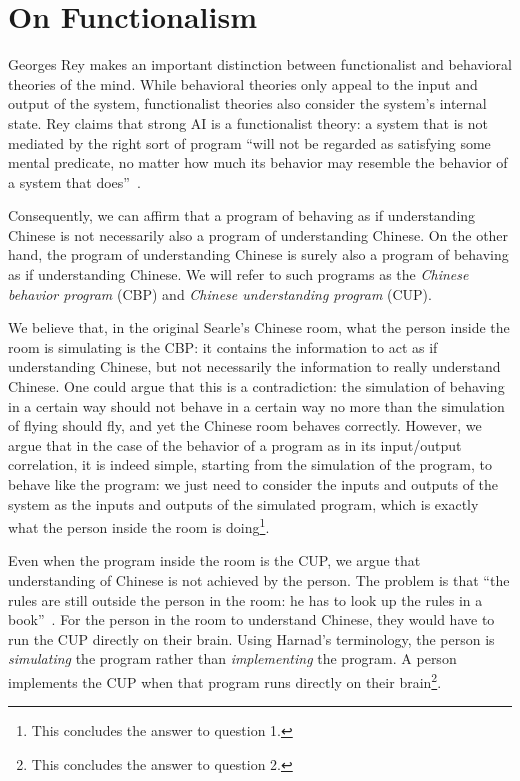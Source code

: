 \section{On Functionalism}
\label{sec:functionalism}

Georges Rey makes an important distinction between functionalist and behavioral theories of the mind. While behavioral theories only appeal to the input and output of the system, functionalist theories also consider the system's internal state. Rey claims that strong AI is a functionalist theory: a system that is not mediated by the right sort of program ``will not be regarded as satisfying some mental predicate, no matter how much its behavior may resemble the behavior of a system that does''~\cite[pp.~2-3]{rey1986s}.

Consequently, we can affirm that a program of behaving as if understanding Chinese is not necessarily also a program of understanding Chinese. On the other hand, the program of understanding Chinese is surely also a program of behaving as if understanding Chinese. We will refer to such programs as the \textit{Chinese behavior program} (CBP) and \textit{Chinese understanding program} (CUP).

We believe that, in the original Searle's Chinese room, what the person inside the room is simulating is the CBP: it contains the information to act as if understanding Chinese, but not necessarily the information to really understand Chinese. One could argue that this is a contradiction: the simulation of behaving in a certain way should not behave in a certain way no more than the simulation of flying should fly, and yet the Chinese room behaves correctly. However, we argue that in the case of the behavior of a program as in its input/output correlation, it is indeed simple, starting from the simulation of the program, to behave like the program: we just need to consider the inputs and outputs of the system as the inputs and outputs of the simulated program, which is exactly what the person inside the room is doing\footnote{This concludes the answer to question 1.}.

Even when the program inside the room is the CUP, we argue that understanding of Chinese is not achieved by the person. The problem is that ``the rules are still outside the person in the room: he has to look up the rules in a book''~\cite[p.~5]{rey1986s}. For the person in the room to understand Chinese, they would have to run the CUP directly on their brain. Using Harnad's terminology, the person is \textit{simulating} the program rather than \textit{implementing} the program. A person implements the CUP when that program runs directly on their brain\footnote{This concludes the answer to question 2.}.

